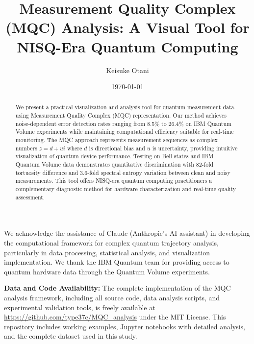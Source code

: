 \documentclass[aps,pra,twocolumn,showpacs,preprintnumbers,amsmath,amssymb]{revtex4-1}
\begin{document}

\title{Measurement Quality Complex (MQC) Analysis: A Visual Tool for NISQ-Era Quantum Computing}

\author{Keisuke Otani}

\date{\today}

\begin{abstract}
We present a practical visualization and analysis tool for quantum measurement data using Measurement Quality Complex (MQC) representation. Our method achieves noise-dependent error detection rates ranging from 8.5\% to 26.4\% on IBM Quantum Volume experiments while maintaining computational efficiency suitable for real-time monitoring. The MQC approach represents measurement sequences as complex numbers $z = d + ui$ where $d$ is directional bias and $u$ is uncertainty, providing intuitive visualization of quantum device performance. Testing on Bell states and IBM Quantum Volume data demonstrates quantitative discrimination with 82-fold tortuosity difference and 3.6-fold spectral entropy variation between clean and noisy measurements. This tool offers NISQ-era quantum computing practitioners a complementary diagnostic method for hardware characterization and real-time quality assessment.
\end{abstract}


\maketitle








\begin{acknowledgments}
We acknowledge the assistance of Claude (Anthropic's AI assistant) in developing the computational framework for complex quantum trajectory analysis, particularly in data processing, statistical analysis, and visualization implementation. We thank the IBM Quantum team for providing access to quantum hardware data through the Quantum Volume experiments.

\textbf{Data and Code Availability:} The complete implementation of the MQC analysis framework, including all source code, data analysis scripts, and experimental validation tools, is freely available at \url{https://github.com/type37c/MQC_analysis} under the MIT License. This repository includes working examples, Jupyter notebooks with detailed analysis, and the complete dataset used in this study.
\end{acknowledgments}



\end{document}
